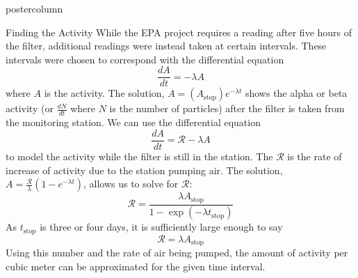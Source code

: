 \documentclass[final,11pt]{beamer}
\renewcommand{\d}[2]{\frac{d #1}{d #2}}
\newlength{\columnheight}
\begin{document}
\begin{frame}
\begin{columns}
		\begin{column}{.39\textwidth}
			\begin{beamercolorbox}[center,wd=\textwidth]{postercolumn}
				\begin{minipage}[T]{.95\textwidth}
					\parbox[t][\columnheight]{\textwidth}{
						\begin{block}{Finding the Activity}
					\footnotesize 	While the EPA project requires a reading after five hours of the filter, additional readings were instead taken at certain intervals. These intervals were chosen to correspond with the differential equation \[\d{A}{t} = -\lambda A\] where $A$ is the activity. The solution, $A = \left(A_{\text{stop}}\right)e^{-\lambda t}$ shows the alpha or beta activity (or $\d{N}{t}$ where $N$ is the number of particles) after the filter is taken from the monitoring station. We can use the differential equation \[\d{A}{t} = \mathcal{R} - \lambda A\] to model the activity while the filter is still in the station. The $\mathcal{R}$ is the rate of increase of activity due to the station pumping air. The solution, $A = \frac{\mathcal{R}}{\lambda}\left(1-e^{-\lambda t}\right)$, allows us to solve for $\mathcal{R}$: \[\mathcal{R} = \frac{\lambda A_{\text{stop}}}{1-\exp(-\lambda t_{\text{stop}})}\] As $t_{\text{stop}}$ is three or four days, it is sufficiently large enough to say \[\mathcal{R} = \lambda A_{\text{stop}}\] Using this number and the rate of air being pumped, the amount of activity per cubic meter can be approximated for the given time interval.
						\end{block}

}
\end{minipage}
\end{beamercolorbox}
\end{column}
\end{columns}
\end{frame}
\end{document}
